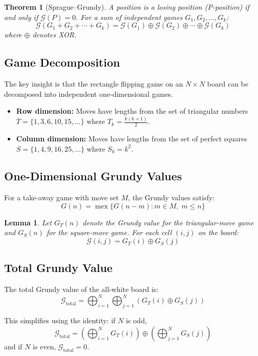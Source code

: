 \documentclass[11pt]{article}
\newtheorem{theorem}{Theorem}
\newtheorem{lemma}{Lemma}
\begin{document}
\begin{theorem}[Sprague--Grundy]
A position is a losing position (P-position) if and only if $\mathcal{G}(P) = 0$.
For a sum of independent games $G_1, G_2, \ldots, G_k$:
\[
\mathcal{G}(G_1 + G_2 + \cdots + G_k) = \mathcal{G}(G_1) \oplus \mathcal{G}(G_2) \oplus \cdots \oplus \mathcal{G}(G_k)
\]
where $\oplus$ denotes XOR.
\end{theorem}

\subsection{Game Decomposition}

The key insight is that the rectangle flipping game on an $N \times N$ board can be decomposed
into independent one-dimensional games.

\begin{itemize}
    \item \textbf{Row dimension:} Moves have lengths from the set of triangular numbers
    $T = \{1, 3, 6, 10, 15, \ldots\}$ where $T_k = \frac{k(k+1)}{2}$.
    \item \textbf{Column dimension:} Moves have lengths from the set of perfect squares
    $S = \{1, 4, 9, 16, 25, \ldots\}$ where $S_k = k^2$.
\end{itemize}

\subsection{One-Dimensional Grundy Values}

For a take-away game with move set $M$, the Grundy values satisfy:
\[
G(n) = \operatorname{mex}\{G(n - m) : m \in M,\; m \leq n\}
\]

\begin{lemma}
Let $G_T(n)$ denote the Grundy value for the triangular-move game and
$G_S(n)$ for the square-move game. For each cell $(i, j)$ on the board:
\[
\mathcal{G}(i, j) = G_T(i) \oplus G_S(j)
\]
\end{lemma}

\subsection{Total Grundy Value}

The total Grundy value of the all-white board is:
\[
\mathcal{G}_{\text{total}} = \bigoplus_{i=1}^{N} \bigoplus_{j=1}^{N} \left(G_T(i) \oplus G_S(j)\right)
\]

This simplifies using the identity: if $N$ is odd,
\[
\mathcal{G}_{\text{total}} = \left(\bigoplus_{i=1}^{N} G_T(i)\right) \oplus \left(\bigoplus_{j=1}^{N} G_S(j)\right)
\]
and if $N$ is even, $\mathcal{G}_{\text{total}} = 0$.
\end{document}
